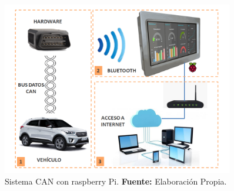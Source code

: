 \begin{figure}[H]
	\centering
		\includegraphics[width=0.9\textwidth]{./Cap00imagen/fig_raspberri_f.png}
	\caption[Sistema CAN con raspberry Pi.]{Sistema CAN con raspberry Pi.\textbf{ Fuente:}  Elaboración Propia.}
	\label{fig_raspberri_c4} %
\end{figure}


